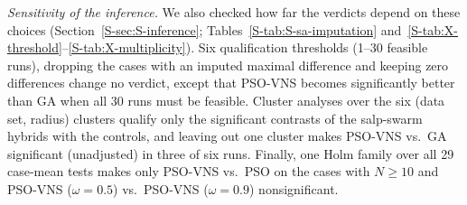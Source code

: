
\emph{Sensitivity of the inference.} We also checked how far the verdicts depend on these choices (Section~\ref{S-sec:S-inference}; Tables~\ref{S-tab:S-sa-imputation} and~\ref{S-tab:X-threshold}--\ref{S-tab:X-multiplicity}). Six qualification thresholds (1--30 feasible runs), dropping the cases with an imputed maximal difference and keeping zero differences change no verdict, except that PSO-VNS becomes significantly better than GA when all 30 runs must be feasible. Cluster analyses over the six (data set, radius) clusters qualify only the significant contrasts of the salp-swarm hybrids with the controls, and leaving out one cluster makes PSO-VNS vs.\ GA significant (unadjusted) in three of six runs. Finally, one Holm family over all 29 case-mean tests makes only PSO-VNS vs.\ PSO on the cases with $N\ge 10$ and PSO-VNS ($\omega=0.5$) vs.\ PSO-VNS ($\omega=0.9$) nonsignificant.

